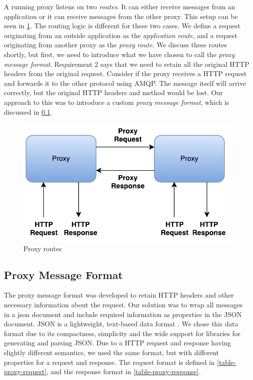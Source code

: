 A running proxy listens on two \textit{routes}. It can either receive messages
from an application or it can receive messages from the other proxy. This setup
can be seen in \cref{figure:dil-routes}. The routing logic is different for
these two cases. We define a request originating from an outside application as
the \textit{application route}, and a request originating from another proxy as
the \textit{proxy route}. We discuss these routes shortly, but first, we need to
introduce what we have chosen to call the \textit{proxy message format}.
Requirement 2 says that we need to retain all the original HTTP headers from the
original request. Consider if the proxy receives a HTTP request and forwards it
to the other protocol using AMQP. The message itself will arrive correctly, but
the original HTTP headers and method would be lost. Our approach to this was to
introduce a custom \textit{proxy message format}, which is discussed in
\cref{section:proxy-header-format}.

\begin{figure}[h]
\centering
\includegraphics[scale=0.7]{images/dil_routes.pdf}
\caption{Proxy routes}
\label{figure:dil-routes}
\end{figure}



\subsection{Proxy Message Format}
\label{section:proxy-header-format}

The proxy message format was developed to retain HTTP headers and other
necessary information about the request. Our solution was to wrap all messages
in a \gls{json} document and include required information as properties in the
JSON document. JSON is a lightweight, text-based data format \cite{rfc-json}. We
chose this data format due to its compactness, simplicity and the wide support
for libraries for generating and parsing JSON. Due to a HTTP request and
response having slightly different semantics, we used the same format, but with
different properties for a request and response. The request format is defined
in \cref{table-proxy-request}, and the response format in
\cref{table-proxy-response}.

